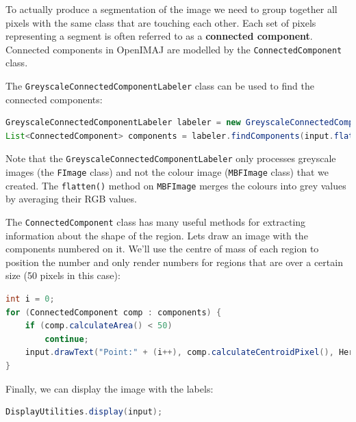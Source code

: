 To actually produce a segmentation of the image we need to group together all pixels with 
the same class that are touching each other. Each set of pixels representing a segment is 
often referred to as a \textbf{connected component}. Connected components in OpenIMAJ are
modelled by the \verb+ConnectedComponent+ class.

The \verb+GreyscaleConnectedComponentLabeler+ class can be used to find the connected components:
\begin{lstlisting}[language=java]
GreyscaleConnectedComponentLabeler labeler = new GreyscaleConnectedComponentLabeler();
List<ConnectedComponent> components = labeler.findComponents(input.flatten());
\end{lstlisting}
Note that the \verb+GreyscaleConnectedComponentLabeler+ 
only processes greyscale images 
(the \verb+FImage+ class) and not the colour image (\verb+MBFImage+ class) that we created. 
The \verb+flatten()+ method on \verb+MBFImage+ merges the colours into grey values by 
averaging their RGB values.

The \verb+ConnectedComponent+ class has many useful methods for extracting information 
about the shape of the region. Lets draw an image with the components numbered on it. We'll use the 
centre of mass of each region to position the number and only render numbers for regions that 
are over a certain size (50 pixels in this case):
\begin{lstlisting}[language=java]
int i = 0;
for (ConnectedComponent comp : components) {
    if (comp.calculateArea() < 50) 
        continue;
    input.drawText("Point:" + (i++), comp.calculateCentroidPixel(), HersheyFont.TIMES_MEDIUM,20);
}
\end{lstlisting}
Finally, we can display the image with the labels:
\begin{lstlisting}[language=java]
DisplayUtilities.display(input);
\end{lstlisting}

